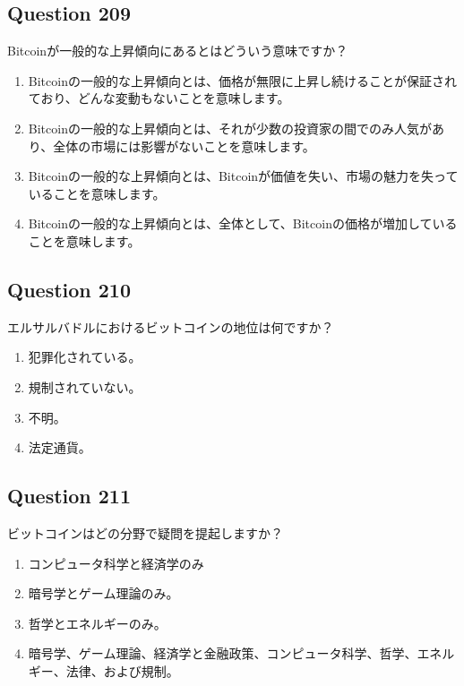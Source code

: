 \documentclass[12pt,a4paper]{article}
\begin{document}
\bigskip


\subsection*{Question 209}
Bitcoinが一般的な上昇傾向にあるとはどういう意味ですか？

\begin{enumerate}[label=\Alph*., leftmargin=*]
\item Bitcoinの一般的な上昇傾向とは、価格が無限に上昇し続けることが保証されており、どんな変動もないことを意味します。
\item Bitcoinの一般的な上昇傾向とは、それが少数の投資家の間でのみ人気があり、全体の市場には影響がないことを意味します。
\item Bitcoinの一般的な上昇傾向とは、Bitcoinが価値を失い、市場の魅力を失っていることを意味します。
\item Bitcoinの一般的な上昇傾向とは、全体として、Bitcoinの価格が増加していることを意味します。
\end{enumerate}

\bigskip


\subsection*{Question 210}
エルサルバドルにおけるビットコインの地位は何ですか？

\begin{enumerate}[label=\Alph*., leftmargin=*]
\item 犯罪化されている。
\item 規制されていない。
\item 不明。
\item 法定通貨。
\end{enumerate}

\bigskip


\subsection*{Question 211}
ビットコインはどの分野で疑問を提起しますか？

\begin{enumerate}[label=\Alph*., leftmargin=*]
\item コンピュータ科学と経済学のみ
\item 暗号学とゲーム理論のみ。
\item 哲学とエネルギーのみ。
\item 暗号学、ゲーム理論、経済学と金融政策、コンピュータ科学、哲学、エネルギー、法律、および規制。
\end{enumerate}
\end{document}
